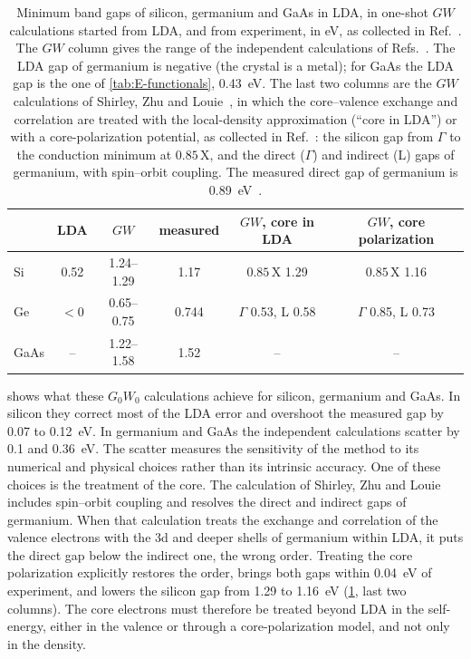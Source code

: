 \begin{table}[t]
  \centering
  \caption{Minimum band gaps of silicon, germanium and GaAs in LDA, in one-shot $GW$ calculations started from LDA, and from experiment, in eV, as collected in Ref.~\cite[Table~I]{aryasetiawan1998gw}. The $GW$ column gives the range of the independent calculations of Refs.~\cite{hybertsen1986electron,godby1988self,rohlfing1993quasiparticle,zhu1991quasiparticle}. The LDA gap of germanium is negative (the crystal is a metal); for GaAs the LDA gap is the one of \cref{tab:E-functionals}, \SI{0.43}{eV}. The last two columns are the $GW$ calculations of Shirley, Zhu and Louie~\cite{shirley1992core}, in which the core--valence exchange and correlation are treated with the local-density approximation (``core in LDA'') or with a core-polarization potential, as collected in Ref.~\cite[Table~II]{aryasetiawan1998gw}: the silicon gap from $\Gamma$ to the conduction minimum at $0.85\,$X, and the direct ($\Gamma$) and indirect (L) gaps of germanium, with spin--orbit coupling. The measured direct gap of germanium is \SI{0.89}{eV}~\cite[Table~II]{aryasetiawan1998gw}.}
  \label{tab:E-gw}
  \begin{tabular}{l ccc cc}
    \toprule
    & LDA & $GW$ & measured & $GW$, core in LDA & $GW$, core polarization \\
    \midrule
    Si & 0.52 & 1.24--1.29 & 1.17 & $0.85\,$X 1.29 & $0.85\,$X 1.16 \\
    Ge & $<0$ & 0.65--0.75 & 0.744 & $\Gamma$ 0.53, L 0.58 & $\Gamma$ 0.85, L 0.73 \\
    GaAs & -- & 1.22--1.58 & 1.52 & -- & -- \\
    \bottomrule
  \end{tabular}
\end{table}

 shows what these $G_0W_0$ calculations achieve for silicon, germanium and GaAs. In silicon they correct most of the LDA error and overshoot the measured gap by 0.07 to \SI{0.12}{eV}. In germanium and GaAs the independent calculations scatter by 0.1 and \SI{0.36}{eV}. The scatter measures the sensitivity of the method to its numerical and physical choices rather than its intrinsic accuracy. One of these choices is the treatment of the core. The calculation of Shirley, Zhu and Louie~\cite{shirley1992core} includes spin--orbit coupling and resolves the direct and indirect gaps of germanium. When that calculation treats the exchange and correlation of the valence electrons with the 3d and deeper shells of germanium within LDA, it puts the direct gap below the indirect one, the wrong order. Treating the core polarization explicitly restores the order, brings both gaps within \SI{0.04}{eV} of experiment, and lowers the silicon gap from 1.29 to \SI{1.16}{eV} (\cref{tab:E-gw}, last two columns). The core electrons must therefore be treated beyond LDA in the self-energy, either in the valence or through a core-polarization model, and not only in the density.

